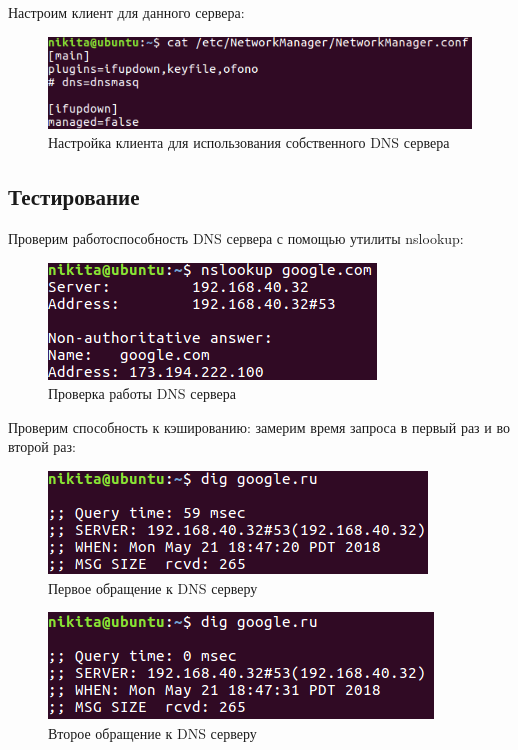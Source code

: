 \documentclass[14pt,a4paper,report]{report}
\begin{document}
Настроим клиент для данного сервера:

\begin{figure}[h!]
	\centering
	\includegraphics[scale = 1.1]{images/3_2.png}
	\caption{Настройка клиента для использования собственного DNS сервера}
	\label{image:14}
\end{figure}

\subsection{Тестирование}

Проверим работоспособность DNS сервера с помощью утилиты nslookup:

\begin{figure}[h!]
	\centering
	\includegraphics[scale = 1.1]{images/3_3.png}
	\caption{Проверка работы DNS сервера}
	\label{image:15}
\end{figure}

Проверим способность к кэшированию: замерим время запроса в первый раз и во второй раз:

\begin{figure}[h!]
	\centering
	\includegraphics[scale = 1.1]{images/3_4.png}
	\caption{Первое обращение к DNS серверу}
	\label{image:16}
\end{figure}

\begin{figure}[h!]
	\centering
	\includegraphics[scale = 1.1]{images/3_5.png}
	\caption{Второе обращение к DNS серверу}
	\label{image:17}
\end{figure}
\end{document}
